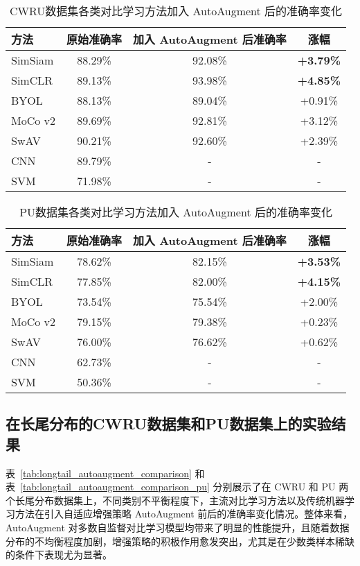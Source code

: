 \documentclass[master]{thesis-uestc}
\begin{document}
\begin{table}[h]
    \centering
    \caption{CWRU数据集各类对比学习方法加入 AutoAugment 后的准确率变化}
    \renewcommand\arraystretch{1.2}
    \begin{tabular}{lccc}
        \toprule
        方法 & 原始准确率 & 加入 AutoAugment 后准确率 & 涨幅 \\
        \midrule
        SimSiam & 88.29\% & 92.08\% & \textbf{+3.79\%} \\
        SimCLR  & 89.13\% & 93.98\% & \textbf{+4.85\%} \\
        BYOL    & 88.13\% & 89.04\% & +0.91\% \\
        MoCo v2 & 89.69\% & 92.81\% & +3.12\% \\
        SwAV    & 90.21\% & 92.60\% & +2.39\% \\
        CNN     & 89.79\% & -        & - \\
        SVM     & 71.98\% & -        & - \\
        \bottomrule
    \end{tabular}
    \label{tab:autoaugment_accuracy_estimate}
\end{table}

\begin{table}[h]
    \centering
    \caption{PU数据集各类对比学习方法加入 AutoAugment 后的准确率变化}
    \renewcommand\arraystretch{1.2}
    \begin{tabular}{lccc}
        \toprule
        方法 & 原始准确率 & 加入 AutoAugment 后准确率 & 涨幅 \\
        \midrule
        SimSiam & 78.62\% & 82.15\% & \textbf{+3.53\%} \\
        SimCLR  & 77.85\% & 82.00\% & \textbf{+4.15\%} \\
        BYOL    & 73.54\% & 75.54\% & +2.00\% \\
        MoCo v2 & 79.15\% & 79.38\% & +0.23\% \\
        SwAV    & 76.00\% & 76.62\% & +0.62\% \\
        CNN     & 62.73\% & -        & - \\
        SVM     & 50.36\% & -        & - \\
        \bottomrule
    \end{tabular}
    \label{tab:autoaugment_accuracy_estimate_pu}
\end{table}

\subsection{在长尾分布的CWRU数据集和PU数据集上的实验结果}
表~\ref{tab:longtail_autoaugment_comparison} 和表~\ref{tab:longtail_autoaugment_comparison_pu} 分别展示了在 CWRU 和 PU 两个长尾分布数据集上，不同类别不平衡程度下，主流对比学习方法以及传统机器学习方法在引入自适应增强策略 AutoAugment 前后的准确率变化情况。整体来看，AutoAugment 对多数自监督对比学习模型均带来了明显的性能提升，且随着数据分布的不均衡程度加剧，增强策略的积极作用愈发突出，尤其是在少数类样本稀缺的条件下表现尤为显著。
\end{document}
